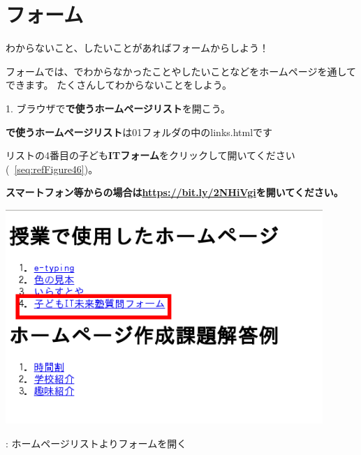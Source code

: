 \documentclass[a4paper,12pt]{jarticle}
\begin{document}
\section{フォーム}
わからないこと、したいことがあればフォームからしよう！

フォームでは、でわからなかったことやしたいことなどをホームページを通してできます。
たくさんしてわからないことをしよう。

1.
ブラウザで\textbf{で使うホームページリスト}を開こう。

\textbf{で使うホームページリスト}は01フォルダの中のlinks.htmlです

リストの4番目の子ども\textbf{ITフォーム}をクリックして開いてください(~\ref{seq:refFigure46})。


\bigskip

{\bfseries
  スマートフォン等からの場合は\url{https://bit.ly/2NHiVgi}を開いてください。}



\centering
\begin{minipage}{\textwidth}
  {\upshape
    \includegraphics[width=0.9\textwidth]{textbook-img245.png}
    \flushleft

    \bigskip
    {\theFigure\label{seq:refFigure46}}:
    ホームページリストよりフォームを開く}
\end{minipage}

\bigskip

\bigskip
\end{document}

